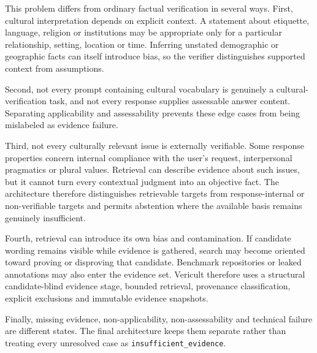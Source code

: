 This problem differs from ordinary factual verification in several ways. First, cultural interpretation depends on explicit context. A statement about etiquette, language, religion or institutions may be appropriate only for a particular relationship, setting, location or time. Inferring unstated demographic or geographic facts can itself introduce bias, so the verifier distinguishes supported context from assumptions.

Second, not every prompt containing cultural vocabulary is genuinely a cultural-verification task, and not every response supplies assessable answer content. Separating applicability and assessability prevents these edge cases from being mislabeled as evidence failure.

Third, not every culturally relevant issue is externally verifiable. Some response properties concern internal compliance with the user's request, interpersonal pragmatics or plural values. Retrieval can describe evidence about such issues, but it cannot turn every contextual judgment into an objective fact. The architecture therefore distinguishes retrievable targets from response-internal or non-verifiable targets and permits abstention where the available basis remains genuinely insufficient.

Fourth, retrieval can introduce its own bias and contamination. If candidate wording remains visible while evidence is gathered, search may become oriented toward proving or disproving that candidate. Benchmark repositories or leaked annotations may also enter the evidence set. Vericult therefore uses a structural candidate-blind evidence stage, bounded retrieval, provenance classification, explicit exclusions and immutable evidence snapshots.

Finally, missing evidence, non-applicability, non-assessability and technical failure are different states. The final architecture keeps them separate rather than treating every unresolved case as \texttt{insufficient\_evidence}.

